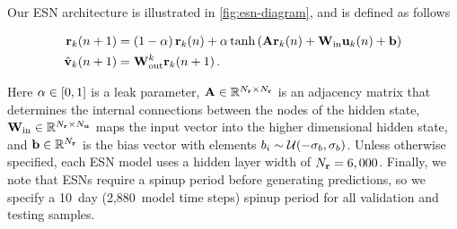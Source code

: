 Our ESN architecture is illustrated in \cref{fig:esn-diagram}, and is defined as
follows
\begin{linenomath*}\begin{equation}
    \begin{aligned}
        \mathbf{r}_{k}(n+1)
        &=
        \left(1-\alpha\right)\mathbf{r}_{k}(n)
        +
        \alpha \tanh\left(
            \mathbf{A} \mathbf{r}_{k}(n) + \mathbf{W}_\text{in} \mathbf{u}_{k}(n) + \mathbf{b}
            \right)
             \\
        \hat{\mathbf{v}}_{k}(n+1)
        &= \mathbf{W}_\text{out}^{k} \mathbf{r}_{k}(n+1) \, .
    \end{aligned}
    \label{eq:rc}
\end{equation}\end{linenomath*}
Here
$\alpha\in[0,1]$ is a leak parameter,
$\mathbf{A} \in \mathbb{R}^{N_{\mathbf{r}}\times N_{\mathbf{r}}}$ is an adjacency matrix that
determines the internal connections between the nodes of the hidden state,
$\mathbf{W}_\text{in} \in \mathbb{R}^{N_{\mathbf{r}}\times N_{\mathbf{u}}}$ maps the input vector
into the higher dimensional hidden state,
and $\mathbf{b}\in\mathbb{R}^{N_{\mathbf{r}}}$
is the bias vector with elements
$b_i \sim \mathcal{U}(-\sigma_{b},\sigma_{b})$.
Unless otherwise specified, each ESN model uses a hidden layer width of
$N_{\mathbf{r}}=6,000$.
Finally, we note that ESNs require a spinup period before generating
predictions, so we specify a 10~day (2,880~model time steps) spinup period for all validation and testing
samples.

